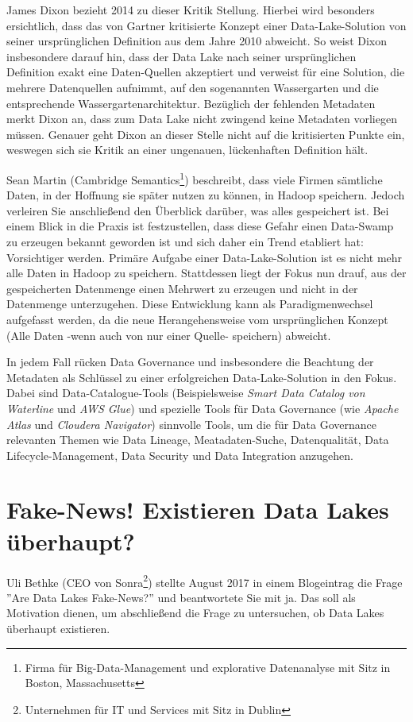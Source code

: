 \documentclass[twoside,twocolumn]{article}
\begin{document}
James Dixon bezieht 2014 zu dieser Kritik Stellung. Hierbei wird besonders ersichtlich, dass das von Gartner kritisierte Konzept einer Data-Lake-Solution von seiner ursprünglichen Definition aus dem Jahre 2010 abweicht. \cite{src14} So weist Dixon insbesondere darauf hin, dass der Data Lake nach seiner ursprünglichen Definition exakt eine Daten-Quellen akzeptiert und verweist für eine Solution, die mehrere Datenquellen aufnimmt, auf den sogenannten Wassergarten und die entsprechende Wassergartenarchitektur.\cite{src15} Bezüglich der fehlenden Metadaten merkt Dixon an, dass zum Data Lake nicht zwingend keine Metadaten vorliegen müssen. Genauer geht Dixon an dieser Stelle nicht auf die kritisierten Punkte ein, weswegen sich sie Kritik an einer ungenauen, lückenhaften Definition hält.

Sean Martin (Cambridge Semantics\footnote{Firma für Big-Data-Management und explorative Datenanalyse mit Sitz in Boston, Massachusetts}) beschreibt, dass viele Firmen sämtliche Daten, in der Hoffnung sie später nutzen zu können, in Hadoop speichern. Jedoch verleiren Sie anschließend den Überblick darüber, was alles gespeichert ist.
Bei einem Blick in die Praxis ist festzustellen, dass diese Gefahr einen Data-Swamp zu erzeugen bekannt geworden ist und sich daher ein Trend etabliert hat: Vorsichtiger werden. Primäre Aufgabe einer Data-Lake-Solution ist es nicht mehr alle Daten in Hadoop zu speichern. Stattdessen liegt der Fokus nun drauf, aus der gespeicherten Datenmenge einen Mehrwert zu erzeugen und nicht in der Datenmenge unterzugehen. \cite{src1} Diese Entwicklung kann als Paradigmenwechsel aufgefasst werden, da die neue Herangehensweise vom ursprünglichen Konzept (Alle Daten -wenn auch von nur einer Quelle- speichern) abweicht.

In jedem Fall rücken Data Governance und insbesondere die Beachtung der Metadaten als Schlüssel zu einer erfolgreichen Data-Lake-Solution in den Fokus. Dabei sind Data-Catalogue-Tools (Beispielsweise \textit{Smart Data Catalog von Waterline} und \textit{AWS Glue}) und spezielle Tools für Data Governance (wie \textit{Apache Atlas} und \textit{Cloudera Navigator}) sinnvolle Tools, um die für Data Governance relevanten Themen wie Data Lineage, Meatadaten-Suche, Datenqualität, Data Lifecycle-Management, Data Security und Data Integration anzugehen.\cite{src8}

\section{Fake-News! Existieren Data Lakes überhaupt?}
Uli Bethke (CEO von Sonra\footnote{Unternehmen für IT und Services mit Sitz in Dublin}) stellte August 2017 in einem Blogeintrag\cite{src4} die Frage ''Are Data Lakes Fake-News?'' und beantwortete Sie mit ja. Das soll als Motivation dienen, um abschließend die Frage zu untersuchen, ob Data Lakes überhaupt existieren.\\
\end{document}
